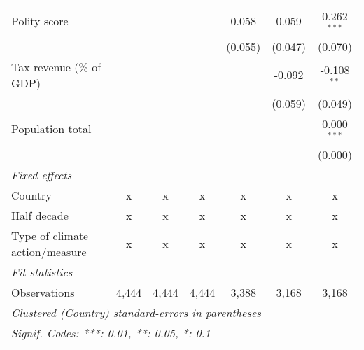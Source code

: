 \begin{tabular}{lcccccc}
   Polity score                                                          &         &         &               & 0.058         & 0.059        & 0.262$^{***}$\\   
                                                                         &         &         &               & (0.055)       & (0.047)      & (0.070)\\   
   Tax revenue (\% of GDP)                                               &         &         &               &               & -0.092       & -0.108$^{**}$\\   
                                                                         &         &         &               &               & (0.059)      & (0.049)\\   
   Population total                                                      &         &         &               &               &              & 0.000$^{***}$\\   
                                                                         &         &         &               &               &              & (0.000)\\   
   \emph{Fixed effects}\\
   Country                                                               & x       & x       & x             & x             & x            & x\\  
   Half decade                                                           & x       & x       & x             & x             & x            & x\\  
   Type of climate action/measure                                        & x       & x       & x             & x             & x            & x\\  
   \midrule \emph{Fit statistics}\\
   Observations                                                          & 4,444   & 4,444   & 4,444         & 3,388         & 3,168        & 3,168\\  
   \midrule
   \multicolumn{7}{l}{\emph{Clustered (Country) standard-errors in parentheses}}\\
   \multicolumn{7}{l}{\emph{Signif. Codes: ***: 0.01, **: 0.05, *: 0.1}}\\
\end{tabular}
\par\endgroup


